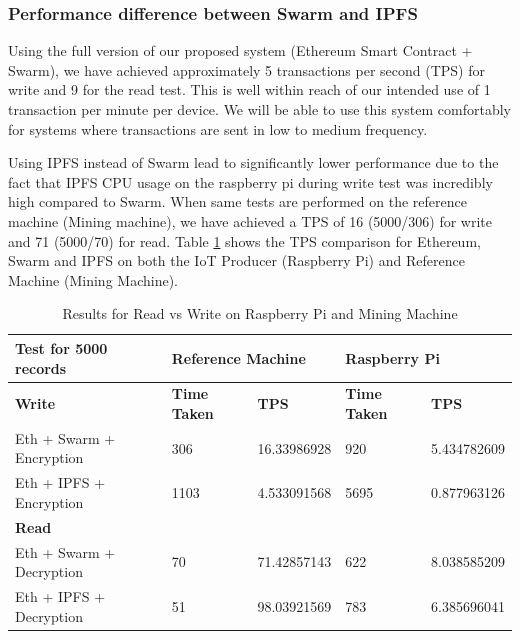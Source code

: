 \documentclass[11pt,openright]{report}
\begin{document}
\subsubsection{Performance difference between Swarm and IPFS}
Using the full version of our proposed system (Ethereum Smart Contract + Swarm), we have achieved approximately 5 transactions per second (TPS) for write and 9 for the read test. This is well within reach of our intended use of 1 transaction per minute per device. We will be able to use this system comfortably for systems where transactions are sent in low to medium frequency.

Using IPFS instead of Swarm lead to significantly lower performance due to the fact that IPFS CPU usage on the raspberry pi during write test was incredibly high compared to Swarm. When same tests are performed on the reference machine (Mining machine), we have achieved a TPS of 16 (5000/306) for write and 71 (5000/70) for read. Table \ref{res_mining_rpi_table} shows the TPS comparison for Ethereum, Swarm and IPFS on both the IoT Producer (Raspberry Pi) and Reference Machine (Mining Machine).

\begin{table}[!htbp]
	\renewcommand{\arraystretch}{1.3}
	\caption{Results for Read vs Write on Raspberry Pi and Mining Machine}
	\label{res_mining_rpi_table}
	\centering
\begin{tabular}{|l|l|l|l|l|} 
\hline
\textbf{Test for 5000 records} & \multicolumn{2}{l|}{\textbf{Reference Machine}} & \multicolumn{2}{l|}{\textbf{Raspberry Pi}}  \\ 
\hline
\textbf{Write}                 & \textbf{Time Taken} & \textbf{TPS}              & \textbf{Time Taken} & \textbf{TPS}          \\ 
\hline
Eth + Swarm + Encryption       & 306                 & 16.33986928               & 920                 & 5.434782609           \\ 
\hline
Eth + IPFS + Encryption        & 1103                & 4.533091568               & 5695                & 0.877963126           \\ 
\hline
\textbf{Read}                  &                     &                           &                     &                       \\ 
\hline
Eth + Swarm + Decryption       & 70                  & 71.42857143               & 622                 & 8.038585209           \\ 
\hline
Eth + IPFS + Decryption        & 51                  & 98.03921569               & 783                 & 6.385696041           \\
\hline
\end{tabular}
\end{table}
\end{document}
